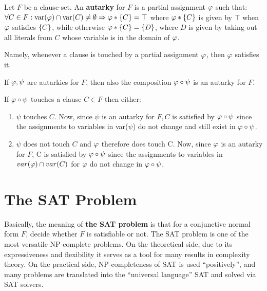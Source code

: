 \documentclass[12pt]{book}
\begin{document}
\begin{defi}\label{def:autarky}
  Let $F$ be a clause-set. An \textbf{autarky} for $F$ is a partial assignment $\varphi$ such that: $\forall C \in F : \operatorname{var}(\varphi) \cap \operatorname{var}(C) \neq \emptyset \Rightarrow \varphi * \{ C \} = \top$ where $\varphi * \{ C \}$ is given by $\top$ when $\varphi$ satisfies $\{ C \}$, while otherwise $\varphi * \{ C \} = \{ D \}$, where $D$ is given by taking out all literals from $C$ whose variable is in the domain of $\varphi$.
\end{defi}
Namely, whenever a clause is touched by a partial assignment $\varphi$, then $\varphi$ satisfies it.

\begin{lem}\label{lem:compaut}
  If $\varphi, \psi$ are autarkies for $F$, then also the composition $\varphi \circ \psi$ is an autarky for $F$.
\end{lem}
\pr If $\varphi \circ \psi$ touches a clause $C \in F$ then either:
\begin{enumerate}
\item $\psi$ touches $C$. Now, since $\psi$ is an autarky for $F, C$ is satisfied by $\varphi \circ \psi$ since the assignments to variables in var($\psi$) do not  change and still exist in $\varphi \circ \psi$.
\item $\psi$ does not touch $C$ and $\varphi$ therefore does touch C. Now, since $\varphi$ is an autarky for $F$, C is satisfied by $\varphi \circ \psi$ since the assignments to variables in $var(\varphi) \cap var(C)$ for $\varphi$ do not change in $\varphi \circ \psi$. 
\end{enumerate}

\section{The SAT Problem}
\label{sec:The SAT Problem}

\begin{defi}\label{def:sat} Basically, the meaning of \textbf{the SAT problem} is that for a conjunctive normal form $F$, decide whether $F$ is satisfiable or not.
The SAT problem is one of the most versatile NP-complete problems. On the theoretical side, due to its expressiveness and flexibility it 
serves as a tool for many results in complexity theory. On the practical side, NP-completeness of SAT is used “positively”, and many problems 
are translated into  the “universal language” SAT and solved via SAT solvers. 
\end{defi}
\end{document}
